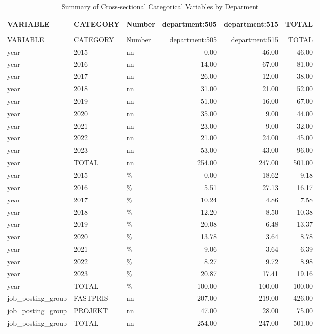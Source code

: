 \begingroup\fontsize{9}{11}\selectfont

\begin{longtable}[t]{lllrrr}
\caption{Summary of Cross-sectional Categorical Variables by Deparment}\\
\toprule
VARIABLE & CATEGORY & Number & department:505 & department:515 & TOTAL\\
\midrule
\endfirsthead
\caption[]{Summary of Cross-sectional Categorical Variables by Deparment }\\
\toprule
VARIABLE & CATEGORY & Number & department:505 & department:515 & TOTAL\\
\midrule
\endhead

\endfoot
\bottomrule
\endlastfoot
year & 2015 & nn & 0.00 & 46.00 & 46.00\\
year & 2016 & nn & 14.00 & 67.00 & 81.00\\
year & 2017 & nn & 26.00 & 12.00 & 38.00\\
year & 2018 & nn & 31.00 & 21.00 & 52.00\\
year & 2019 & nn & 51.00 & 16.00 & 67.00\\
year & 2020 & nn & 35.00 & 9.00 & 44.00\\
year & 2021 & nn & 23.00 & 9.00 & 32.00\\
year & 2022 & nn & 21.00 & 24.00 & 45.00\\
year & 2023 & nn & 53.00 & 43.00 & 96.00\\
year & TOTAL & nn & 254.00 & 247.00 & 501.00\\
year & 2015 & \% & 0.00 & 18.62 & 9.18\\
year & 2016 & \% & 5.51 & 27.13 & 16.17\\
year & 2017 & \% & 10.24 & 4.86 & 7.58\\
year & 2018 & \% & 12.20 & 8.50 & 10.38\\
year & 2019 & \% & 20.08 & 6.48 & 13.37\\
year & 2020 & \% & 13.78 & 3.64 & 8.78\\
year & 2021 & \% & 9.06 & 3.64 & 6.39\\
year & 2022 & \% & 8.27 & 9.72 & 8.98\\
year & 2023 & \% & 20.87 & 17.41 & 19.16\\
year & TOTAL & \% & 100.00 & 100.00 & 100.00\\
job\_posting\_group & FASTPRIS & nn & 207.00 & 219.00 & 426.00\\
job\_posting\_group & PROJEKT & nn & 47.00 & 28.00 & 75.00\\
job\_posting\_group & TOTAL & nn & 254.00 & 247.00 & 501.00\\

\end{longtable}
